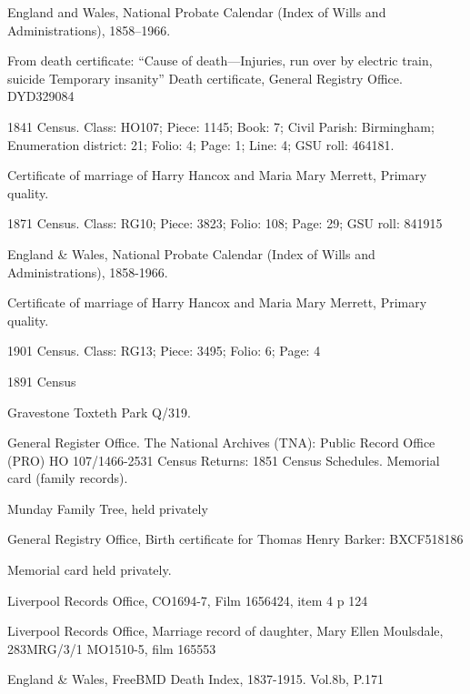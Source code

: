 \begin{thebibliography}{99}
	England and Wales, National Probate Calendar (Index of Wills and Administrations), 1858--1966.

	From death certificate: ``Cause of death---Injuries, run over by electric train, suicide Temporary insanity''
	Death certificate, General Registry Office. DYD329084
	
	1841 Census. 
	Class: HO107; Piece: 1145; Book: 7; Civil Parish: Birmingham; Enumeration district: 21; Folio: 4; Page: 1; Line: 4; GSU roll: 464181.

	Certificate of marriage of Harry Hancox and Maria Mary Merrett, Primary quality. 
	
	1871 Census.
	Class: RG10; Piece: 3823; Folio: 108; Page: 29; GSU roll: 841915
	
	England \& Wales, National Probate Calendar (Index of Wills and Administrations), 1858-1966.
	
	Certificate of marriage of Harry Hancox and Maria Mary Merrett, Primary quality.
	
	1901 Census.
	Class: RG13; Piece: 3495; Folio: 6; Page: 4
	
	1891 Census
	
	Gravestone Toxteth Park Q/319. 
	
	General Register Office. The National Archives (TNA): Public Record Office (PRO) HO 107/1466-2531 Census Returns: 1851 Census Schedules.
	Memorial card (family records). 
	
	Munday Family Tree, held privately

	 General Registry Office, Birth certificate for Thomas Henry Barker: BXCF518186
	 
	 Memorial card held privately.
	 
	Liverpool Records Office, CO1694-7, Film 1656424, item 4 p 124

	Liverpool Records Office, Marriage record of daughter, Mary Ellen Moulsdale, 283MRG/3/1 MO1510-5, film 165553

	England \& Wales, FreeBMD Death Index, 1837-1915. Vol.8b, P.171
	

\end{thebibliography}
